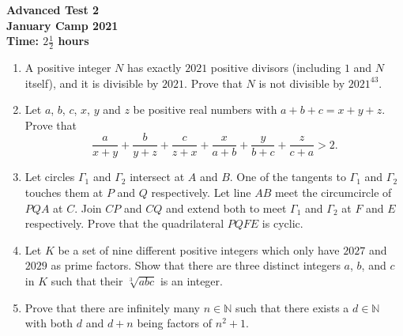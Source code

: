 \documentclass{article}
\begin{document}
\thispagestyle{empty}

\begin{center}
  \textbf{\Large Advanced Test 2}
  \\ \vspace{1em}
  \textbf{\large January Camp 2021}
  \\ \vspace{1em}
  \textbf{\large Time: $2\frac{1}{2}$ hours}
\end{center}

\vspace{24pt}

\begin{enumerate}[1.]

\item %
A positive integer $N$ has exactly $2021$ positive divisors (including $1$ and $N$ itself), and it is divisible by $2021$.
Prove that $N$ is not divisible by $2021^{43}$.


\item %
Let $a$, $b$, $c$, $x$, $y$ and $z$ be positive real numbers with $a + b + c = x + y + z$.
Prove that 
\[ \frac{a}{x + y} + \frac{b}{y + z} + \frac{c}{z + x} + \frac{x}{a + b} + \frac{y}{b + c} + \frac{z}{c + a} > 2. \]


\item %
Let circles $\Gamma_1$ and $\Gamma_2$ intersect at $A$ and $B$. One of the tangents to $\Gamma_1$ and $\Gamma_2$ touches them at $P$ and $Q$ respectively. Let line $AB$ meet the circumcircle of $PQA$ at $C$. Join $CP$ and $CQ$ and extend both to meet $\Gamma_1$ and $\Gamma_2$ at $F$ and $E$ respectively. Prove that the quadrilateral $PQFE$ is cyclic. 


\item %
Let $K$ be a set of nine different positive integers which only have $2027$ and $2029$ as prime factors.
Show that there are three distinct integers $a$, $b$, and $c$ in $K$ such that their $\sqrt[3]{abc}$ is an integer.


\item %
Prove that there are infinitely many $n \in \mathbb{N}$ such that there exists a $d \in \mathbb{N}$ with both $d$ and $d + n$ being factors of $n^2 + 1$.

\end{enumerate}
\end{document}

